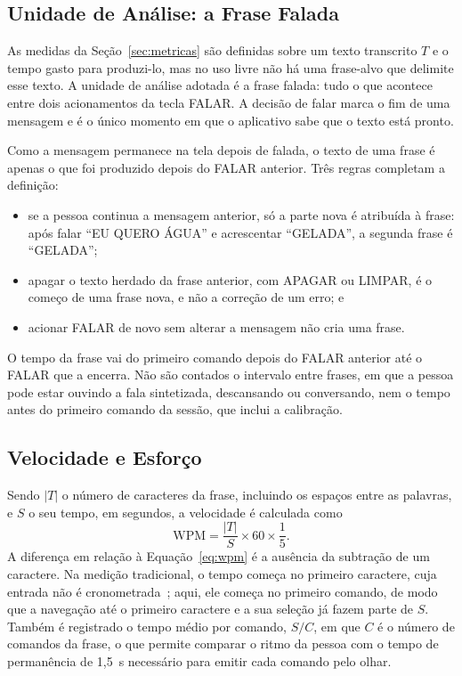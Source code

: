 \subsection{Unidade de Análise: a Frase Falada} \label{sec:met_unidade}

As medidas da Seção~\ref{sec:metricas} são definidas sobre um texto transcrito $T$ e o tempo gasto para produzi-lo, mas no uso livre não há uma frase-alvo que delimite esse texto. A unidade de análise adotada é a frase falada: tudo o que acontece entre dois acionamentos da tecla FALAR. A decisão de falar marca o fim de uma mensagem e é o único momento em que o aplicativo sabe que o texto está pronto.

Como a mensagem permanece na tela depois de falada, o texto de uma frase é apenas o que foi produzido depois do FALAR anterior. Três regras completam a definição:
\begin{itemize}
    \item se a pessoa continua a mensagem anterior, só a parte nova é atribuída à frase: após falar ``EU QUERO ÁGUA'' e acrescentar ``GELADA'', a segunda frase é ``GELADA'';
    \item apagar o texto herdado da frase anterior, com APAGAR ou LIMPAR, é o começo de uma frase nova, e não a correção de um erro; e
    \item acionar FALAR de novo sem alterar a mensagem não cria uma frase.
\end{itemize}
O tempo da frase vai do primeiro comando depois do FALAR anterior até o FALAR que a encerra. Não são contados o intervalo entre frases, em que a pessoa pode estar ouvindo a fala sintetizada, descansando ou conversando, nem o tempo antes do primeiro comando da sessão, que inclui a calibração.

\subsection{Velocidade e Esforço} \label{sec:met_velocidade}

Sendo $|T|$ o número de caracteres da frase, incluindo os espaços entre as palavras, e $S$ o seu tempo, em segundos, a velocidade é calculada como
\begin{equation}
    \mathrm{WPM} = \frac{|T|}{S} \times 60 \times \frac{1}{5}.
    \label{eq:wpm_app}
\end{equation}
A diferença em relação à Equação~\ref{eq:wpm} é a ausência da subtração de um caractere. Na medição tradicional, o tempo começa no primeiro caractere, cuja entrada não é cronometrada~\cite{wobbrock2007measures}; aqui, ele começa no primeiro comando, de modo que a navegação até o primeiro caractere e a sua seleção já fazem parte de $S$. Também é registrado o tempo médio por comando, $S/C$, em que $C$ é o número de comandos da frase, o que permite comparar o ritmo da pessoa com o tempo de permanência de 1,5~s necessário para emitir cada comando pelo olhar.

